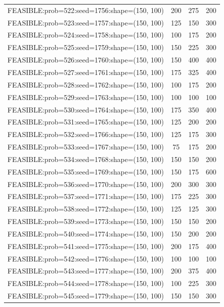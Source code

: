 \begin{longtable}{lccc}
FEASIBLE:prob=522:seed=1756:shape=(150, 100) &  200 &   275 &    200 \\
FEASIBLE:prob=523:seed=1757:shape=(150, 100) &  125 &   150 &    300 \\
FEASIBLE:prob=524:seed=1758:shape=(150, 100) &  100 &   175 &    200 \\
FEASIBLE:prob=525:seed=1759:shape=(150, 100) &  150 &   225 &    300 \\
FEASIBLE:prob=526:seed=1760:shape=(150, 100) &  150 &   400 &    400 \\
FEASIBLE:prob=527:seed=1761:shape=(150, 100) &  175 &   325 &    400 \\
FEASIBLE:prob=528:seed=1762:shape=(150, 100) &  100 &   175 &    200 \\
FEASIBLE:prob=529:seed=1763:shape=(150, 100) &  100 &   100 &    100 \\
FEASIBLE:prob=530:seed=1764:shape=(150, 100) &  175 &   350 &    400 \\
FEASIBLE:prob=531:seed=1765:shape=(150, 100) &  125 &   200 &    200 \\
FEASIBLE:prob=532:seed=1766:shape=(150, 100) &  125 &   175 &    300 \\
FEASIBLE:prob=533:seed=1767:shape=(150, 100) &   75 &   175 &    200 \\
FEASIBLE:prob=534:seed=1768:shape=(150, 100) &  150 &   150 &    200 \\
FEASIBLE:prob=535:seed=1769:shape=(150, 100) &  150 &   175 &    600 \\
FEASIBLE:prob=536:seed=1770:shape=(150, 100) &  200 &   300 &    300 \\
FEASIBLE:prob=537:seed=1771:shape=(150, 100) &  175 &   225 &    300 \\
FEASIBLE:prob=538:seed=1772:shape=(150, 100) &  125 &   125 &    300 \\
FEASIBLE:prob=539:seed=1773:shape=(150, 100) &  150 &   150 &    200 \\
FEASIBLE:prob=540:seed=1774:shape=(150, 100) &  150 &   200 &    200 \\
FEASIBLE:prob=541:seed=1775:shape=(150, 100) &  200 &   175 &    400 \\
FEASIBLE:prob=542:seed=1776:shape=(150, 100) &  100 &   100 &    100 \\
FEASIBLE:prob=543:seed=1777:shape=(150, 100) &  200 &   375 &    400 \\
FEASIBLE:prob=544:seed=1778:shape=(150, 100) &  100 &   225 &    300 \\
FEASIBLE:prob=545:seed=1779:shape=(150, 100) &  150 &   150 &    300 \\

\end{longtable}

